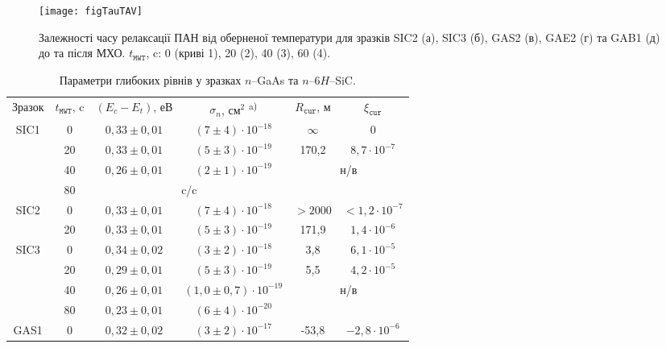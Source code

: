 \documentclass[a4paper,14pt,oneside,openany]{memoir}
\begin{document}
\begin{figure}
\center
\texttt{[image: figTauTAV]}
\caption{\label{figTauTAV}
Залежності часу релаксації ПАН від оберненої температури для
зразків SIC2 (а), SIC3 (б), GAS2 (в), GAE2 (г) та GAB1 (д) до та після МХО.
$t_\mathtt{MWT}$, c: 0 (криві 1), 20 (2), 40 (3), 60 (4).
}%
\end{figure}

\begin{table}
\caption{\label{tabMW}Параметри глибоких рівнів у  зразках $n$--GaAs та $n$--6$H$--SiC.
}
\center
\begin{tabular}{|c|c|c|c|c|c|}
\hline
Зразок& $t_\mathtt{MWT}$, c & $(E_c-E_t)$, еВ &$\sigma_n$, см$^2$\textsuperscript{ a)}&$R_\mathtt{cur}$, м&$\xi_\mathtt{cur}$\\
\hhline{|======|}
SIC1& 0 & $0,33\pm0,01$ &$(7\pm4)\cdot10^{-18}$&$\infty$&0\\ \cline{2-6}
& 20 & $0,33\pm0,01$ &$(5\pm3)\cdot10^{-19}$&170,2&$8,7\cdot10^{-7}$\\ \cline{2-6}
& 40 & $0,26\pm0,01$ &$(2\pm1)\cdot10^{-19}$&\multicolumn{2}{c|}{\multirow{2}{*}{н/в}}\\ \cline{2-4}
& 80 & \multicolumn{2}{c|}{c/c}&\multicolumn{2}{c|}{}\\ \hline
SIC2& 0 & $0,33\pm0,01$ &$(7\pm4)\cdot10^{-18}$&$>2000$&$<1,2\cdot10^{-7}$\\ \cline{2-6}
& 20 & $0,33\pm0,01$ &$(5\pm3)\cdot10^{-19}$&171,9&$1,4\cdot10^{-6}$\\ \hline
SIC3& 0 & $0,34\pm0,02$ &$(3\pm2)\cdot10^{-18}$&3,8&$6,1\cdot10^{-5}$\\ \cline{2-6}
& 20 & $0,29\pm0,01$ &$(5\pm3)\cdot10^{-19}$&5,5&$4,2\cdot10^{-5}$\\ \cline{2-6}
& 40 & $0,26\pm0,01$ &$(1,0\pm0,7)\cdot10^{-19}$&\multicolumn{2}{c|}{\multirow{2}{*}{н/в}}\\ \cline{2-4}
& 80 & $0,23\pm0,01$ &$(6\pm4)\cdot10^{-20}$&\multicolumn{2}{c|}{}\\ \hline
GAS1& 0 & $0,32\pm0,02$ &$(3\pm2)\cdot10^{-17}$&-53,8&$-2,8\cdot10^{-6}$\\ \cline{2-6}

\end{tabular}
\end{table}
\end{document}
